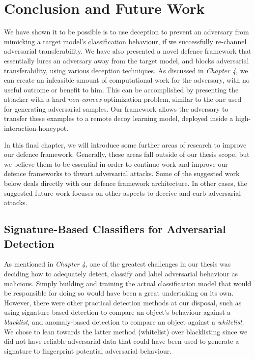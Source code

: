 \documentclass[grad,lot,lof,11pt,oneside,onehalfspace]{RUthesis}
\begin{document}
\chapter{Conclusion and Future Work}
We have shown it to be possible is to use deception to prevent an adversary from mimicking a target model's classification behaviour, if we successfully re-channel adversarial transferability. We have also presented a novel defence framework that essentially lures an adversary away from the target model, 
and blocks adversarial transferability, using various deception techniques. As  discussed in \textit{Chapter 4}, we can create an infeasible amount of computational work for the adversary, with no useful outcome or benefit to him. This can be accomplished by presenting the attacker with a hard \textit{non-convex} optimization problem, similar to the one used for generating adversarial samples. Our framework allows the adversary to transfer these examples to a remote decoy learning model, deployed inside a high-interaction-honeypot. 

In this final chapter, we will introduce some further areas of research to improve our defence framework. Generally, these areas fall outside of our thesis scope, but we believe them to be essential in order to continue work and improve our defence frameworks to thwart adversarial attacks. Some of the suggested work below deals directly with our defence framework architecture. In other cases, the suggested future work focuses on other aspects to deceive and curb adversarial attacks. 

\section{Signature-Based Classifiers for Adversarial Detection}
As mentioned in \textit{Chapter 4}, one of the greatest challenges in our thesis was deciding how to adequately detect, classify and label adversarial behaviour as malicious. Simply building and training the actual classification model that would be responsible for doing so would have been a great undertaking on its own. However, there were other practical detection methods at our disposal, such as using signature-based detection to compare an object's behaviour against a \textit{blacklist}, and anomaly-based detection to compare an object against a \textit{whitelist}. We chose to lean towards the latter method (whitelist) over blacklisting since we did not have reliable adversarial data that could have been used to generate a signature to fingerprint potential adversarial behaviour. 
\end{document}
